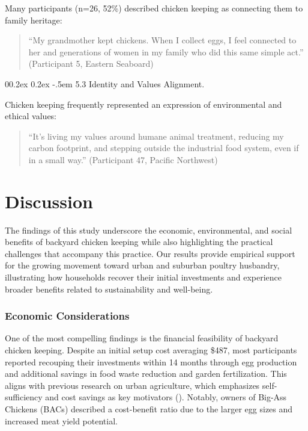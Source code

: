 \documentclass[
  man,
  floatsintext,
  longtable,
  nolmodern,
  notxfonts,
  notimes,
  colorlinks=true,linkcolor=blue,citecolor=blue,urlcolor=blue]{apa7}
\makeatletter
\renewcommand{\paragraph}{\@startsection{paragraph}{4}{\parindent}%
	{0\baselineskip \@plus 0.2ex \@minus 0.2ex}%
	{-.5em}%
	{\normalfont\normalsize\bfseries\typesectitle}}
\makeatother
\begin{document}
Many participants (n=26, 52\%) described chicken keeping as connecting
them to family heritage:

\begin{quote}
``My grandmother kept chickens. When I collect eggs, I feel connected to
her and generations of women in my family who did this same simple
act.'' (Participant 5, Eastern Seaboard)
\end{quote}

\paragraph{5.3 Identity and Values
Alignment.}\label{identity-and-values-alignment}

Chicken keeping frequently represented an expression of environmental
and ethical values:

\begin{quote}
``It's living my values around humane animal treatment, reducing my
carbon footprint, and stepping outside the industrial food system, even
if in a small way.'' (Participant 47, Pacific Northwest)
\end{quote}

\section{Discussion}\label{discussion}

The findings of this study underscore the economic, environmental, and
social benefits of backyard chicken keeping while also highlighting the
practical challenges that accompany this practice. Our results provide
empirical support for the growing movement toward urban and suburban
poultry husbandry, illustrating how households recover their initial
investments and experience broader benefits related to sustainability
and well-being.

\subsubsection{Economic Considerations}\label{economic-considerations}

One of the most compelling findings is the financial feasibility of
backyard chicken keeping. Despite an initial setup cost averaging \$487,
most participants reported recouping their investments within 14 months
through egg production and additional savings in food waste reduction
and garden fertilization. This aligns with previous research on urban
agriculture, which emphasizes self-sufficiency and cost savings as key
motivators (). Notably, owners of Big-Ass Chickens (BACs) described a
cost-benefit ratio due to the larger egg sizes and increased meat yield
potential.
\end{document}
